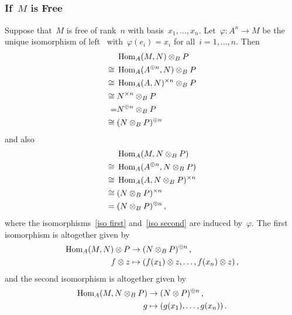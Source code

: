 \addtocounter{subsection}{1}





\subsection{}



\subsubsection{If~$M$ is Free}

Suppose that~$M$ is free of rank~$n$ with basis~$x_1, \dotsc, x_n$.
Let~$\varphi \colon A^n \to M$ be the unique isomorphism of left~{} with~$\varphi(e_i) = x_i$ for all~$i = 1, \dotsc, n$.
Then
\begin{align}
       {}&  \operatorname{Hom}_A(M, N) \otimes_B P  \notag  \\
  \cong{}&  \operatorname{Hom}_A(A^{\oplus n}, N) \otimes_B P \label{iso first} \\
  \cong{}&  \operatorname{Hom}_A(A, N)^{\times n} \otimes_B P \notag  \\
  \cong{}&  N^{\times n} \otimes_B P  \notag  \\
        =&  N^{\oplus n} \otimes_B P  \notag  \\
  \cong{}&  (N \otimes_B P)^{\oplus n}  \notag
\end{align}
and also
\begin{align}
       {}&  \operatorname{Hom}_A(M, N \otimes_B P)  \notag  \\
  \cong{}&  \operatorname{Hom}_A(A^{\oplus n}, N \otimes_B P) \label{iso second}  \\
  \cong{}&  \operatorname{Hom}_A(A, N \otimes_B P)^{\times n} \notag  \\
  \cong{}&  (N \otimes_B P)^{\times n}  \notag  \\
      ={}&  (N \otimes_B P)^{\oplus n}  \notag  \,,
\end{align}
where the isomorphisms~\eqref{iso first} and~\eqref{iso second} are induced by~$\varphi$.
The first isomorphism is altogether given by
\begin{align*}
            \operatorname{Hom}_A(M, N) \otimes P
  &\to      (N \otimes_B P)^{\oplus n} \,,
  \\
            f \otimes z
  &\mapsto  ( f(x_1) \otimes z, \dotsc, f(x_n) \otimes z ) \,,
\end{align*}
and the second isomorphism is altogether given by
\begin{align*}
            \operatorname{Hom}_A(M, N \otimes_B P)
  &\to      (N \otimes P)^{\oplus n} \,,
  \\
            g
  &\mapsto  ( g(x_1), \dotsc, g(x_n) ) \,.
\end{align*}

